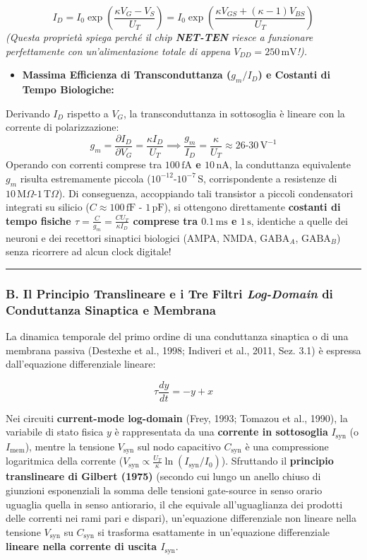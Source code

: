 \documentclass[11pt,a4paper]{article}
\begin{document}
\[
I_D = I_0 \exp\left(\frac{\kappa V_G - V_S}{U_T}\right) = I_0 \exp\left(\frac{\kappa V_{GS} + (\kappa - 1)V_{BS}}{U_T}\right)
\]
\textit{(Questa proprietà spiega perché il chip \textbf{NET-TEN} riesce a funzionare perfettamente con un'alimentazione totale di appena \textbf{$V_{DD} = 250\,\text{mV}$}!).}
\begin{itemize}
  \item \textbf{Massima Efficienza di Transconduttanza ($g_m / I_D$) e Costanti di Tempo Biologiche:}
\end{itemize}
Derivando $I_D$ rispetto a $V_G$, la transconduttanza in sottosoglia è lineare con la corrente di polarizzazione:
\[
g_m = \frac{\partial I_D}{\partial V_G} = \frac{\kappa I_D}{U_T} \implies \frac{g_m}{I_D} = \frac{\kappa}{U_T} \approx 26\text{-}30\,\text{V}^{-1}
\]
Operando con correnti comprese tra \textbf{$100\,\text{fA}$ e $10\,\text{nA}$}, la conduttanza equivalente $g_m$ risulta estremamente piccola ($10^{-12}\text{-}10^{-7}\,\text{S}$, corrispondente a resistenze di $10\,\text{M}\Omega\text{-}1\,\text{T}\Omega$). Di conseguenza, accoppiando tali transistor a piccoli condensatori integrati su silicio (\textbf{$C \approx 100\,\text{fF} \text{ - } 1\,\text{pF}$}), si ottengono direttamente \textbf{costanti di tempo fisiche $\tau = \frac{C}{g_m} = \frac{C U_T}{\kappa I_D}$ comprese tra $0.1\,\text{ms}$ e $1\,\text{s}$}, identiche a quelle dei neuroni e dei recettori sinaptici biologici (AMPA, NMDA, $\text{GABA}_A$, $\text{GABA}_B$) senza ricorrere ad alcun clock digitale!

\bigskip\hrule\bigskip

\subsubsection{B. Il Principio Translineare e i Tre Filtri \textit{Log-Domain} di Conduttanza Sinaptica e Membrana}
La dinamica temporale del primo ordine di una conduttanza sinaptica o di una membrana passiva (Destexhe et al., 1998; Indiveri et al., 2011, Sez. 3.1) è espressa dall'equazione differenziale lineare:

\[
\tau \frac{dy}{dt} = -y + x
\]

Nei circuiti \textbf{current-mode log-domain} (Frey, 1993; Tomazou et al., 1990), la variabile di stato fisica $y$ è rappresentata da una \textbf{corrente in sottosoglia} $I_{\text{syn}}$ (o $I_{\text{mem}}$), mentre la tensione $V_{\text{syn}}$ sul nodo capacitivo $C_{\text{syn}}$ è una compressione logaritmica della corrente ($V_{\text{syn}} \propto \frac{U_T}{\kappa} \ln(I_{\text{syn}}/I_0)$). Sfruttando il \textbf{principio translineare di Gilbert (1975)} (secondo cui lungo un anello chiuso di giunzioni esponenziali la somma delle tensioni gate-source in senso orario uguaglia quella in senso antiorario, il che equivale all'uguaglianza dei prodotti delle correnti nei rami pari e dispari), un'equazione differenziale non lineare nella tensione $V_{\text{syn}}$ su $C_{\text{syn}}$ si trasforma esattamente in un'equazione differenziale \textbf{lineare nella corrente di uscita $I_{\text{syn}}$}.
\end{document}
